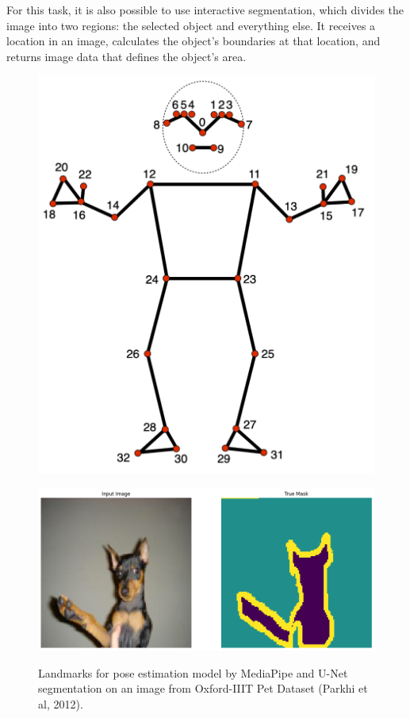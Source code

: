 For this task, it is also possible to use interactive segmentation, which divides the image into two regions: the selected object and everything else. It receives a location in an image, calculates the object's boundaries at that location, and returns image data that defines the object's area.



\begin{figure}[ht]
	\centering
	\begin{minipage}{0.3\textwidth}
		\centering
		\includegraphics[width=0.9\linewidth]{images/pose_landmarks_index.png}
		\label{fig:pose_landmarks}
	\end{minipage}%
	\begin{minipage}{0.48\textwidth}
		\centering
		\includegraphics[width=\linewidth]{images/dog.png}
		\label{fig:dog}
	\end{minipage}
	\caption{Landmarks for pose estimation model by MediaPipe and U-Net segmentation on an image from Oxford-IIIT Pet Dataset (Parkhi et al, 2012).}
	\label{fig:segmentation} %
\end{figure}

